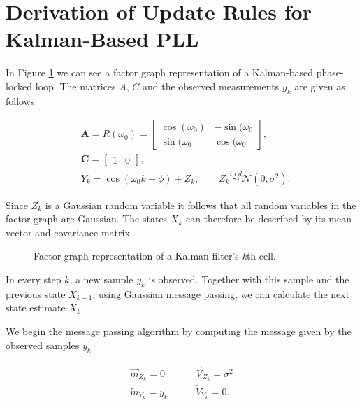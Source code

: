 \documentclass[11pt,a4paper,twoside]{report}
\newcommand{\messF}[3]{\overrightarrow{#1}_{{#2}_{k{#3}}}}
\newcommand{\messB}[3]{\overleftarrow{#1}_{{#2}_{k{#3}}}}
\newcommand{\mat}[1]{\mathbf{#1}}
\begin{document}
\pagestyle{plain}


\chapter*{Derivation of Update Rules for Kalman-Based PLL}
In Figure \ref{factor_graph} we can see a factor graph representation of a Kalman-based phase-locked loop. The matrices $A$, $C$ and the observed measurements $y_k$ are given as follows

\begin{align*}
	&\mat{A} = R(\omega_0) = 
		\begin{bmatrix}
			\cos{(\omega_0)} & -\sin{(\omega_0} \\
			\sin{(\omega_0} & \cos{(\omega_0}
		\end{bmatrix},
	\\
	&\mat{C} = 
		\begin{bmatrix}
			1 & 0
		\end{bmatrix},
	\\
	&Y_k = \cos({\omega_0k + \phi}) + Z_k, \qquad Z_k \overset{i.i.d}{\sim} \mathcal{N}\left(0, \sigma^2\right).
\end{align*}

Since $Z_k$ is a Gaussian random variable it follows that all random variables in the factor graph are Gaussian. The states $X_k$ can therefore be described by its mean vector and covariance matrix.

\begin{figure}[h]
	\centering

  	\caption[Exemplary factor graph]
   	{Factor graph representation of a Kalman filter's \textit{k}th cell.}
	\label{factor_graph}
\end{figure}

In every step $k$, a new sample $y_k$ is observed. Together with this sample and the previous state $X_{k-1}$, using Gaussian message passing, we can calculate the next state estimate $X_k$.

We begin the message passing algorithm by computing the message given by the observed samples $y_k$ \cite{SIP}

\begin{align}
	\label{eq: noise}
	\messF{m}{Z}{} = 0  \qquad &\messF{V}{Z}{} = \sigma^2 \\
	\label{eq: sample}
	\messB{m}{Y}{} = y_k  \qquad &\messB{V}{Y}{} = 0.
\end{align}
\end{document}
